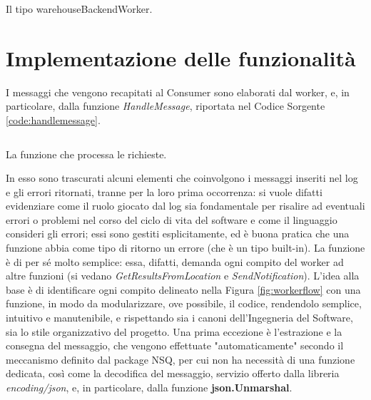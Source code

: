 \begin{listing}
\inputminted[baselinestretch=0.8]{go}{sources/warehousebackendworker.go}
\caption{Il tipo warehouseBackendWorker.}
\label{code:warehousebackendworker}
\end{listing}

\section{Implementazione delle funzionalità}
I messaggi che vengono recapitati al Consumer sono elaborati dal worker, e, in particolare, dalla funzione \textit{HandleMessage}, riportata nel Codice Sorgente \ref{code:handlemessage}.
\begin{listing}
\inputminted[baselinestretch=0.9]{go}{sources/handlemessage.go}
\caption{La funzione che processa le richieste.}
\label{code:handlemessage}
\end{listing}
In esso sono trascurati alcuni elementi che coinvolgono i messaggi inseriti nel log e gli errori ritornati, tranne per la loro prima occorrenza: si vuole difatti evidenziare come il ruolo giocato dal log sia fondamentale per risalire ad eventuali errori o problemi nel corso del ciclo di vita del software e come il linguaggio consideri gli errori; essi sono gestiti esplicitamente, ed è buona pratica che una funzione abbia come tipo di ritorno un errore (che è un tipo built-in). La funzione è di per sé molto semplice: essa, difatti, demanda ogni compito del worker ad altre funzioni (si vedano \textit{GetResultsFromLocation} e \textit{SendNotification}). L'idea alla base è di identificare ogni compito delineato nella Figura \ref{fig:workerflow} con una funzione, in modo da modularizzare, ove possibile, il codice, rendendolo semplice, intuitivo e manutenibile, e rispettando sia i canoni dell'Ingegneria del Software, sia lo stile organizzativo del progetto. Una prima eccezione è l'estrazione e la consegna del messaggio, che vengono effettuate "automaticamente" secondo il meccanismo definito dal package NSQ, per cui non ha necessità di una funzione dedicata, così come la decodifica del messaggio, servizio offerto dalla libreria \textit{encoding/json}, e, in particolare, dalla funzione \textbf{json.Unmarshal}. 
\\
\\
